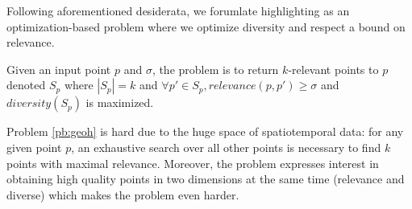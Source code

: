 Following aforementioned desiderata, we forumlate highlighting as an optimization-based problem where we optimize diversity and respect a bound on relevance.

\begin{problem}[GeoHighlight]
\label{pb:geoh}
Given an input point $p$ and $\sigma$, the problem is to return $k$-relevant points to $p$ denoted $S_p$ where $|S_p| = k$ and $\forall p' \in S_p, \mathit{relevance}(p,p') \geq \sigma$ and $\mathit{diversity}(S_p)$ is maximized.
\end{problem}

Problem \ref{pb:geoh} is hard due to the huge space of spatiotemporal data: for any given point $p$, an exhaustive search over all other points is necessary to find $k$ points with maximal relevance. Moreover, the problem expresses interest in obtaining high quality points in two dimensions at the same time (relevance and diverse) which makes the problem even harder.

